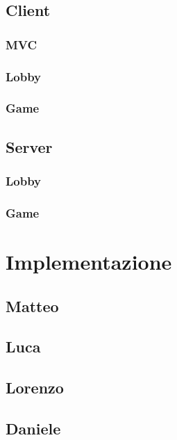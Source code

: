 \documentclass[a4paper,10pt]{article}
\begin{document}
    \subsection{Client}

    \subsubsection{MVC}

    \subsubsection{Lobby}

    \subsubsection{Game}

    \subsection{Server}

    \subsubsection{Lobby}

    \subsubsection{Game}

    \newpage


    \section{Implementazione}

    \subsection{Matteo}

    \subsection{Luca}

    \subsection{Lorenzo}

    \subsection{Daniele}
\end{document}
